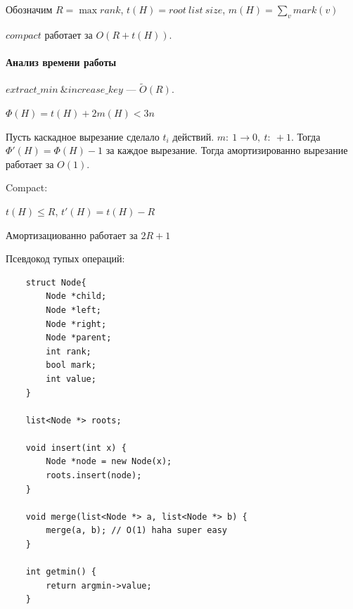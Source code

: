 \documentclass[12pt]{article}
\begin{document}
Обозначим $R = \max rank$, $t(H) = root\ list\ size$, $m(H) = \sum_{v} mark(v)$

$compact$ работает за $O(R + t(H))$.

\paragraph{Анализ времени работы}

$extract\_min\ \& increase\_key$ --- $\tilde O(R)$.

$\Phi(H) = t(H) + 2m(H) < 3n$

Пусть каскадное вырезание сделало $t_i $ действий. $m:\ 1 \rightarrow 0,\ t:\ +1$. Тогда $\Phi'(H) = \Phi(H) - 1$ за каждое вырезание.
Тогда амортизированно вырезание работает за $O(1)$.

Compact:

$t(H) \le R$, $t'(H) = t(H) - R$

Амортизациованно работает за $2R + 1$

Псевдокод тупых операций:
\begin{verbatim}
    struct Node{ 
        Node *child;
        Node *left;
        Node *right;
        Node *parent;
        int rank;
        bool mark;
        int value;
    }

    list<Node *> roots;

    void insert(int x) {
        Node *node = new Node(x);
        roots.insert(node);
    }

    void merge(list<Node *> a, list<Node *> b) {
        merge(a, b); // O(1) haha super easy
    }

    int getmin() {
        return argmin->value;
    }
\end{verbatim}
\end{document}
